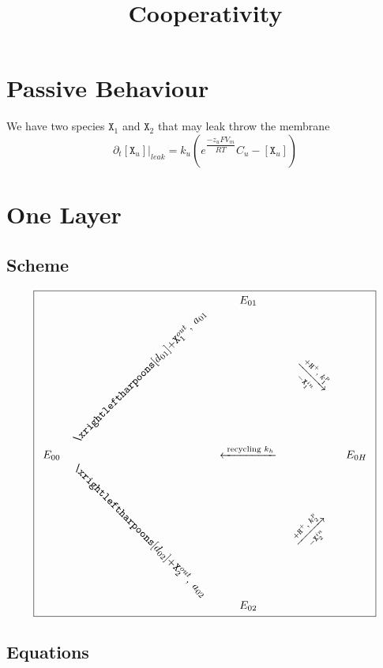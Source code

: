 \documentclass[aps,onecolumn,12pt]{revtex4}
\newcommand{\mychem}[1]{\mathtt{#1}}
\newcommand{\myconc}[1]{\left[#1\right]}
\newcommand{\spx}{\mychem{X}}
\newcommand{\spproton}{\mychem{H^+}}
\newcommand{\myrotate}[2]{\rotatebox[origin=c]{#1}{#2}}
\begin{document}
\title{Cooperativity}
\maketitle
\tableofcontents

\section{Passive Behaviour}
We have two species $\spx_1$ and $\spx_2$ that may leak throw the membrane
\begin{equation}
	\partial_t \left.\myconc{\spx_u}\right\vert_{leak} = k_u \left( e^{\dfrac{-z_u F V_m }{RT}} C_u - \myconc{\spx_u}\right)
\end{equation}

\section{One Layer}

\subsection{Scheme}
\begin{equation}
\boxed{
\begin{array}{ccccc}
 & & E_{01}  &  & \\
 &  \myrotate{45}{$\xrightleftharpoons[d_{01}]{+\spx_1^{out},\;a_{01}}$} &   & \myrotate{-45}{$\xrightarrow[-\spx_1^{in}]{+ \spproton, \; k^p_1}$} &  \\
E_{00}  &  & \xleftarrow{\text{ recycling } k_h } &   & E_{0H} \\
  & \myrotate{-45}{$\xrightleftharpoons[d_{02}]{+\spx_2^{out},\;a_{02}}$} &   & \myrotate{+45}{$\xrightarrow[-\spx_2^{in}]{+ \spproton, \; k^p_2}$} & \\
 & & E_{02} & & \\
 \end{array}
 }
\end{equation}

\subsection{Equations}
\end{document}
